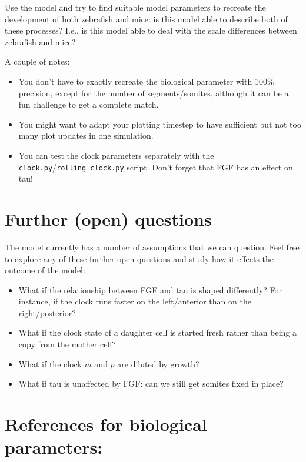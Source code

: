 \documentclass[
  letterpaper,
  DIV=11,
  numbers=noendperiod]{scrreprt}
\providecommand{\tightlist}{%
  \setlength{\itemsep}{0pt}\setlength{\parskip}{0pt}}\usepackage{longtable,booktabs,array}
\theoremstyle{definition}
\theoremstyle{remark}
\begin{document}
\begin{enumerate}
  Use the model and try to find suitable model parameters to recreate
  the development of both zebrafish and mice: is this model able to
  describe both of these processes? I.e., is this model able to deal
  with the scale differences between zebrafish and mice?

  A couple of notes:

  \begin{itemize}
  \tightlist
  \item
    You don't have to exactly recreate the biological parameter with
    100\% precision, except for the number of segments/somites, although
    it can be a fun challenge to get a complete match.
  \item
    You might want to adapt your plotting timestep to have sufficient
    but not too many plot updates in one simulation.
  \item
    You can test the clock parameters separately with the
    \texttt{clock.py}/\texttt{rolling\_clock.py} script. Don't forget
    that FGF has an effect on tau!
  \end{itemize}
\end{enumerate}

\section{Further (open) questions}\label{further-open-questions}

The model currently has a number of assumptions that we can question.
Feel free to explore any of these further open questions and study how
it effects the outcome of the model:

\begin{itemize}
\tightlist
\item
  What if the relationship between FGF and tau is shaped differently?
  For instance, if the clock runs faster on the left/anterior than on
  the right/posterior?
\item
  What if the clock state of a daughter cell is started fresh rather
  than being a copy from the mother cell?
\item
  What if the clock \(m\) and \(p\) are diluted by growth?
\item
  What if tau is unaffected by FGF: can we still get somites fixed in
  place?
\end{itemize}

\section{References for biological
parameters:}\label{references-for-biological-parameters}
\end{document}
